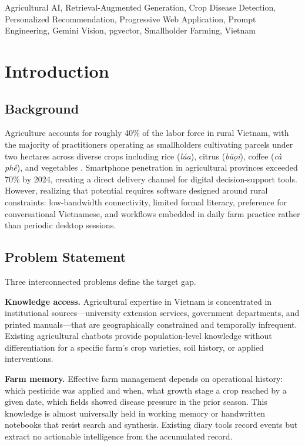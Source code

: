 \documentclass[conference]{IEEEtran}
\begin{document}
\begin{IEEEkeywords}
Agricultural AI, Retrieval-Augmented Generation, Crop Disease Detection, Personalized Recommendation, Progressive Web Application, Prompt Engineering, Gemini Vision, pgvector, Smallholder Farming, Vietnam
\end{IEEEkeywords}

\section{Introduction}

\subsection{Background}

Agriculture accounts for roughly 40\% of the labor force in rural Vietnam, with the majority of practitioners operating as smallholders cultivating parcels under two hectares across diverse crops including rice (\textit{l\'{u}a}), citrus (\textit{b\u{u}\d{o}i}), coffee (\textit{c\`{a} ph\^{e}}), and vegetables \cite{gso2023}. Smartphone penetration in agricultural provinces exceeded 70\% by 2024, creating a direct delivery channel for digital decision-support tools. However, realizing that potential requires software designed around rural constraints: low-bandwidth connectivity, limited formal literacy, preference for conversational Vietnamese, and workflows embedded in daily farm practice rather than periodic desktop sessions.

\subsection{Problem Statement}

Three interconnected problems define the target gap.

\textbf{Knowledge access.} Agricultural expertise in Vietnam is concentrated in institutional sources---university extension services, government departments, and printed manuals---that are geographically constrained and temporally infrequent. Existing agricultural chatbots provide population-level knowledge without differentiation for a specific farm's crop varieties, soil history, or applied interventions.

\textbf{Farm memory.} Effective farm management depends on operational history: which pesticide was applied and when, what growth stage a crop reached by a given date, which fields showed disease pressure in the prior season. This knowledge is almost universally held in working memory or handwritten notebooks that resist search and synthesis. Existing diary tools record events but extract no actionable intelligence from the accumulated record.
\end{document}
